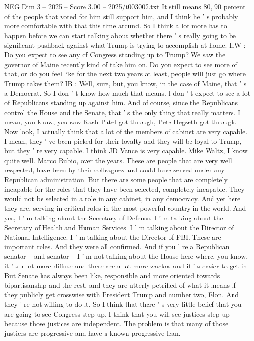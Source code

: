 \begin{textsample}{NEG Dim 3 – 2025 – Score 3.00 – 2025/t003002.txt}
It still means 80, 90 percent of the people that voted for him still support him, and I think he ' s probably more comfortable with that this time around.
So I think a lot more has to happen before we can start talking about whether there ' s really going to be significant pushback against what Trump is trying to accomplish at home.
HW : Do you expect to see any of Congress standing up to Trump?
We saw the governor of Maine recently kind of take him on.
Do you expect to see more of that, or do you feel like for the next two years at least, people will just go where Trump takes them?
IB : Well, sure, but, you know, in the case of Maine, that ' s a Democrat.
So I don ' t know how much that means.
I don ' t expect to see a lot of Republicans standing up against him.
And of course, since the Republicans control the House and the Senate, that ' s the only thing that really matters.
I mean, you know, you saw Kash Patel got through, Pete Hegseth got through.
Now look, I actually think that a lot of the members of cabinet are very capable.
I mean, they ' ve been picked for their loyalty and they will be loyal to Trump, but they ' re very capable.
I think JD Vance is very capable.
Mike Waltz, I know quite well.
Marco Rubio, over the years.
These are people that are very well respected, have been by their colleagues and could have served under any Republican administration.
But there are some people that are completely incapable for the roles that they have been selected, completely incapable.
They would not be selected in a role in any cabinet, in any democracy.
And yet here they are, serving in critical roles in the most powerful country in the world.
And yes, I ' m talking about the Secretary of Defense.
I ' m talking about the Secretary of Health and Human Services.
I ' m talking about the Director of National Intelligence.
I ' m talking about the Director of FBI.
These are important roles.
And they were all confirmed.
And if you ' re a Republican senator -- and senator -- I ' m not talking about the House here where, you know, it ' s a lot more diffuse and there are a lot more wackos and it ' s easier to get in.
But Senate has always been like, responsible and more oriented towards bipartisanship and the rest, and they are utterly petrified of what it means if they publicly get crosswise with President Trump and number two, Elon.
And they ' re not willing to do it.
So I think that there ' s very little belief that you are going to see Congress step up.
I think that you will see justices step up because those justices are independent.
The problem is that many of those justices are progressive and have a known progressive lean.

\end{textsample}
